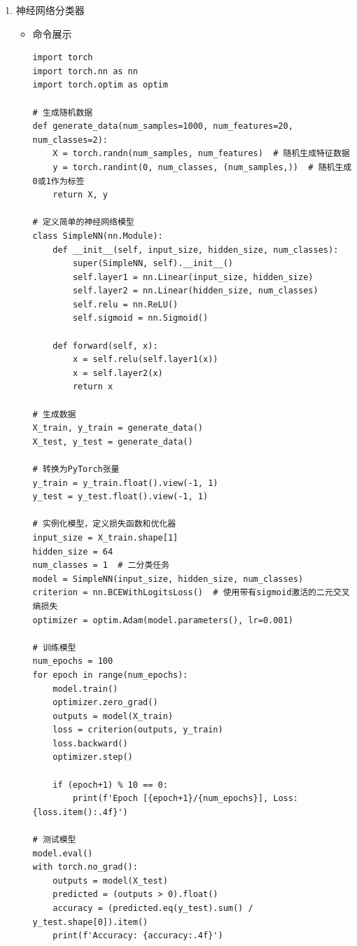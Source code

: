 \documentclass[UTF8]{ctexart}
\begin{document}
\begin{enumerate}
  \item 神经网络分类器
  \begin{itemize}
  \item 命令展示
  \begin{verbatim}
import torch
import torch.nn as nn
import torch.optim as optim

# 生成随机数据
def generate_data(num_samples=1000, num_features=20, num_classes=2):
    X = torch.randn(num_samples, num_features)  # 随机生成特征数据
    y = torch.randint(0, num_classes, (num_samples,))  # 随机生成0或1作为标签
    return X, y

# 定义简单的神经网络模型
class SimpleNN(nn.Module):
    def __init__(self, input_size, hidden_size, num_classes):
        super(SimpleNN, self).__init__()
        self.layer1 = nn.Linear(input_size, hidden_size)
        self.layer2 = nn.Linear(hidden_size, num_classes)
        self.relu = nn.ReLU()
        self.sigmoid = nn.Sigmoid()

    def forward(self, x):
        x = self.relu(self.layer1(x))
        x = self.layer2(x)
        return x

# 生成数据
X_train, y_train = generate_data()
X_test, y_test = generate_data()

# 转换为PyTorch张量
y_train = y_train.float().view(-1, 1)
y_test = y_test.float().view(-1, 1)

# 实例化模型，定义损失函数和优化器
input_size = X_train.shape[1]
hidden_size = 64
num_classes = 1  # 二分类任务
model = SimpleNN(input_size, hidden_size, num_classes)
criterion = nn.BCEWithLogitsLoss()  # 使用带有sigmoid激活的二元交叉熵损失
optimizer = optim.Adam(model.parameters(), lr=0.001)

# 训练模型
num_epochs = 100
for epoch in range(num_epochs):
    model.train()
    optimizer.zero_grad()
    outputs = model(X_train)
    loss = criterion(outputs, y_train)
    loss.backward()
    optimizer.step()

    if (epoch+1) % 10 == 0:
        print(f'Epoch [{epoch+1}/{num_epochs}], Loss: {loss.item():.4f}')

# 测试模型
model.eval()
with torch.no_grad():
    outputs = model(X_test)
    predicted = (outputs > 0).float()
    accuracy = (predicted.eq(y_test).sum() / y_test.shape[0]).item()
    print(f'Accuracy: {accuracy:.4f}')

  \end{verbatim}


\end{itemize}
\end{enumerate}
\end{document}
